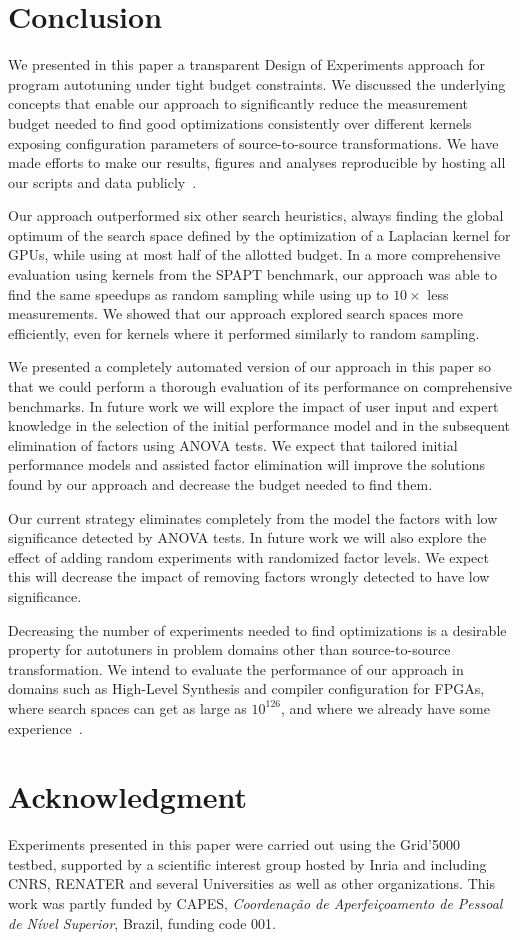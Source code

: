 \documentclass[conference]{IEEEtran}
\begin{document}
\section{Conclusion}
\label{sec:org7006fb1}
We presented in this paper a transparent Design of Experiments approach for
program autotuning under tight budget constraints. We discussed the underlying
concepts that enable our approach to significantly reduce the measurement budget
needed to find good optimizations consistently over different kernels exposing
configuration parameters of source-to-source transformations. We have made
efforts to make our results, figures and analyses reproducible by hosting all
our scripts and data publicly~\cite{bruel2018ipdps19}.

Our approach outperformed six other search heuristics, always finding the global
optimum of the search space defined by the optimization of a Laplacian kernel
for GPUs, while using at most half of the allotted budget. In a more
comprehensive evaluation using kernels from the SPAPT benchmark, our approach
was able to find the same speedups as random sampling while using up to
\(10\times\) less measurements. We showed that our approach explored search spaces
more efficiently, even for kernels where it performed similarly to random
sampling.

We presented a completely automated version of our approach in this paper so
that we could perform a thorough evaluation of its performance on comprehensive
benchmarks. In future work we will explore the impact of user input and expert
knowledge in the selection of the initial performance model and in the
subsequent elimination of factors using ANOVA tests. We expect that tailored
initial performance models and assisted factor elimination will improve the
solutions found by our approach and decrease the budget needed to find them.

Our current strategy eliminates completely from the model the factors with low
significance detected by ANOVA tests. In future work we will also explore the
effect of adding random experiments with randomized factor levels. We expect
this will decrease the impact of removing factors wrongly detected to have low
significance.

Decreasing the number of experiments needed to find optimizations is a desirable
property for autotuners in problem domains other than source-to-source
transformation. We intend to evaluate the performance of our approach in domains
such as High-Level Synthesis and compiler configuration for FPGAs, where search
spaces can get as large as \(10^{126}\), and where we already have some
experience~\cite{bruel2017autotuninghls}.
\section*{Acknowledgment}
\label{sec:org13bb0aa}
Experiments presented in this paper were carried out using the Grid'5000
testbed, supported by a scientific interest group hosted by Inria and including
CNRS, RENATER and several Universities as well as other organizations.
This work was partly funded by CAPES, \emph{Coordenação de Aperfeiçoamento de Pessoal
de Nível Superior}, Brazil, funding code 001.



\end{document}
